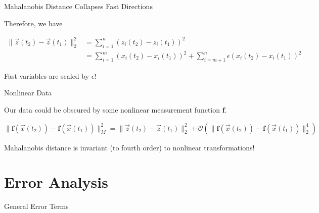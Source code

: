 \documentclass[12pt]{beamer}
\begin{document}
\begin{frame}{Mahalanobis Distance Collapses Fast Directions}

Therefore, we have

\begin{equation*}
\begin{aligned} 
\| \vec{z}(t_2) - \vec{z}(t_1) \|^2_2 &= \sum_{i=1}^n \left( z_i(t_2) - z_i(t_1) \right)^2 \\
&= \sum_{i=1}^m  \left( x_i(t_2) - x_i(t_1) \right)^2 + \sum_{i=m+1}^n \epsilon \left( x_i(t_2) - x_i(t_1) \right)^2
\end{aligned}
\end{equation*}

Fast variables are scaled by $\epsilon$!

\end{frame}


\begin{frame}{Nonlinear Data}

Our data could be obscured by some nonlinear measurement function $\mathbf{f}$. 


$$\| \mathbf{f} (\vec{x}(t_2)) - \mathbf{f} (\vec{x}(t_1)) \|^2_M = \| \vec{z}(t_2) - \vec{z}(t_1) \|^2_2 + \mathcal{O}(\|  \mathbf{f} (\vec{x}(t_2)) - \mathbf{f} (\vec{x}(t_1)) \|^4_2)$$

Mahalanobis distance is invariant (to fourth order) to nonlinear transformations!

\end{frame}

\section{Error Analysis}

\begin{frame}{General Error Terms}


\end{frame}
\end{document}
